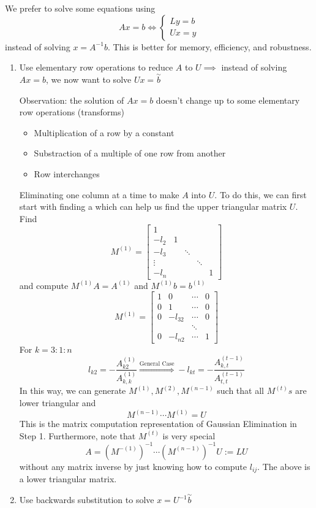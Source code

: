 \documentclass[12pt]{scrartcl}
\begin{document}
\begin{definition}
  We prefer to solve some equations using 
  \[Ax = b \Leftrightarrow \begin{cases}
    Ly = b\\ Ux = y
  \end{cases}\] 
  instead of solving $x = A^{-1}b$. This is better for memory, efficiency, and robustness.
  \begin{enumerate}
    \item Use elementary row operations to reduce $A$ to $U \implies$ instead of solving $Ax = b$, we now want to solve $Ux = \overset{\sim}{b}$
    
    Observation: the solution of $Ax = b$ doesn't change up to some elementary row operations (transforms)
    \begin{itemize}
      \item Multiplication of a row by a constant
      \item Substraction of a multiple of one row from another
      \item Row interchanges
    \end{itemize}
    Eliminating one column at a time to make $A$ into $U$. To do this, we can first start with finding a 
    which can help us find the upper triangular matrix $U$. Find 
    \[M^{(1)} = \begin{bmatrix}
      1\\
      -l_2 &  1\\
      -l_3 & & \ddots\\
      \vdots & & & \ddots\\
      -l_n & & & & 1
    \end{bmatrix}\]
    and compute $M^{(1)}A = A^{(1)}$ and $M^{(1)}b = b^{(1)}$
    \[M^{(1)} = \begin{bmatrix}
      1 & 0 & \cdots & 0\\
      0 & 1 & \cdots & 0\\
      0 & -l_{32} & \cdots & 0\\
      & & \ddots & \\
      0 & -l_{n2} & \cdots & 1
    \end{bmatrix}\]
    For $k = 3: 1: n$
    \[l_{k2} = -\frac{A_{k2}^{(1)}}{A^{(1)}_{{k, k}}} \overset{\text{General Case}}{\Longrightarrow} -l_{kt} = -\frac{A^{(t-1)}_{k, t}}{A^{(t-1)}_{t,t}}\]
    In this way, we can generate $M^{(1)}, M^{(2)}, M^{(n-1)}$ such that all $M^{(t)}s$ are lower triangular and 
    \[M^{(n-1)} \cdots M^{(1)} = U\]
    This is the matrix computation representation of Gaussian Elimination in Step 1. Furthermore, note that 
    $M^{(t)}$ is very special 
    \[A = (M^{-(1)})^{-1} \cdots (M^{(n-1)})^{-1} U := LU\]
    without any matrix inverse by just knowing how to compute $l_{ij}$. The above is a lower triangular matrix.
    \item Use backwards substitution to solve $x = U^{-1}\overset{\sim}{b}$
    

\end{enumerate}
\end{definition}
\end{document}
